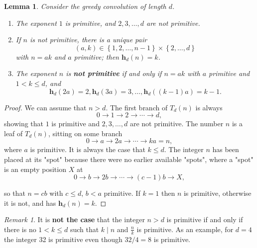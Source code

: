 \documentclass[12pt]{article}
\theoremstyle{definition}
\theoremstyle{remark}
\newtheorem{remark}{Remark}
\theoremstyle{plain}
\newtheorem{lemma}{Lemma}
\newcommand{\set}[1]{\left\{{#1}\right\}}
\newcommand{\divides}[2]{#1 \mid #2}
\newcommand{\height}[2]{\mathbf{h}_{#1}(#2)}
\begin{document}
\begin{lemma}
Consider the greedy convolution of length \(d\).
\begin{enumerate}[label={(\roman*)}]
\item The exponent \(1\) is primitive, and \(2,3,\dots,d\) are not primitive.
\item If \(n\) is not primitive, there is a unique pair
\[(a,k) \in \set{1,2,\dots,n-1} \times \set{2,\dots,d}\] with
\(n=ak\) and \(a\) primitive; then \(\height{d}{n}=k\).
\item The exponent \(n\) is \textbf{not primitive} if and only if
\(n=ak\) with \(a\) primitive and \(1 < k \le d\), and
\[\height{d}{2a}=2, \height{d}{3a}=3, \dots, \height{d}{(k-1)a}=k-1.\]
\end{enumerate}
\label{org7ffedaf}
\end{lemma}
\begin{proof}
We can assume that \(n > d\). The first branch of \(T_{d}(n)\) is always
\[0 \to 1 \to 2 \to \cdots \to d,\]
showing
that \(1\) is primitive and \(2,3,\dots,d\) are not primitive.
The number \(n\) is a leaf of \(T_{d}(n)\), sitting on some branch
\[0 \to a \to 2a \to \cdots \to ka=n,\]
where
\(a\) is primitive. It is always the case that \(k \le d\). The integer \(n\) has been placed at its "spot"
because there were no earlier available "spots", where a "spot" is an empty position \(X\) at
\[0 \to b \to 2b \to \cdots \to (c-1)b \to X,\]

so that \(n=cb\) with \(c \le d\), \(b<a\) primitive. If \(k=1\) then
\(n\) is primitive, otherwise it is not, and has \(\height{d}{n}=k\).
\end{proof}

\begin{remark}
It is \textbf{not the case} that the integer \(n>d\) is  primitive if and only if
there is no \(1 < k \le d\) such that \(\divides{k}{n}\) and  \(\frac{n}{k}\) is primitive.
As an example, for \(d=4\) the integer 32 is primitive even though \(32/4=8\) is primitive.
\end{remark}
\end{document}
